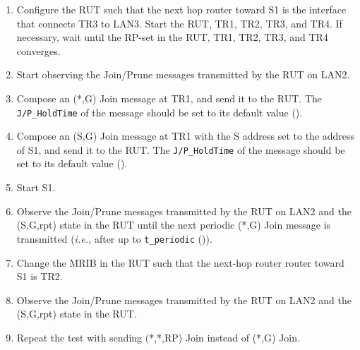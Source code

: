 \documentclass[11pt]{report}
\newcommand{\ie}{\emph{i.e.,}\xspace}
\begin{document}
\begin{enumerate}

  \item Configure the RUT such that the next hop router toward S1 is
  the interface that connects TR3 to LAN3. Start the RUT, TR1, TR2, TR3, and
  TR4. If necessary, wait until the RP-set in the RUT, TR1, TR2, TR3, and TR4
  converges.

  \item Start observing the Join/Prune messages transmitted by the RUT on
  LAN2.

  \item Compose an (*,G) Join message at TR1, and send it to the RUT.
  The \verb=J/P_HoldTime= of the message should be set to its default
  value ({\PimsmJPHoldTime}).

  \item Compose an (S,G) Join message at TR1 with the S address set to the
  address of S1, and send it to the RUT. 
  The \verb=J/P_HoldTime= of the message should be set to its default
  value ({\PimsmJPHoldTime}).

  \item Start S1.

  \item Observe the Join/Prune messages transmitted by the RUT on LAN2 and the
  (S,G,rpt) state in the RUT until the next periodic (*,G) Join message is
  transmitted (\ie after up to \verb=t_periodic= ({\PimsmTPeriodic})).

  \item Change the MRIB in the RUT such that the next-hop router
  router toward S1 is TR2.

  \item Observe the Join/Prune messages transmitted by the RUT on LAN2 and the
  (S,G,rpt) state in the RUT.

  \item Repeat the test with sending (*,*,RP) Join instead of (*,G) Join.

\end{enumerate}

\end{document}
